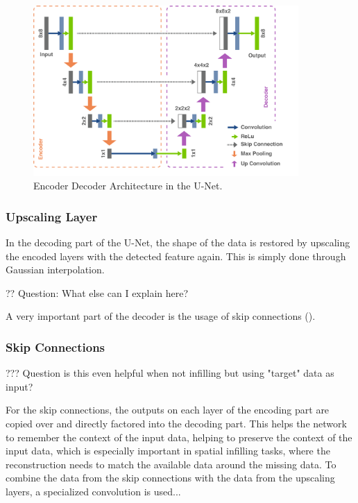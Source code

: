 \begin{figure}
    \centering
    \includegraphics[width=0.9\textwidth]{resources/images/u_net.png}
    \caption{Encoder Decoder Architecture in the U-Net.}
    \label{fig:u_net}
\end{figure}

\subsubsection*{Upscaling Layer}

In the decoding part of the U-Net, the shape of the data is restored by upscaling the encoded layers with the detected feature again. This is simply done through Gaussian interpolation.

?? Question: What else can I explain here?

A very important part of the decoder is the usage of skip connections (\cite{liu2018inpaining}). 

\subsubsection*{Skip Connections}

??? Question is this even helpful when not infilling but using "target" data as input?

For the skip connections, the outputs on each layer of the encoding part are copied over and directly factored into the decoding part. This helps the network to remember the context of the input data, helping to preserve the context of the input data, which is especially important in spatial infilling tasks, where the reconstruction needs to match the available data around the missing data. To combine the data from the skip connections with the data from the upscaling layers, a specialized convolution is used... 

